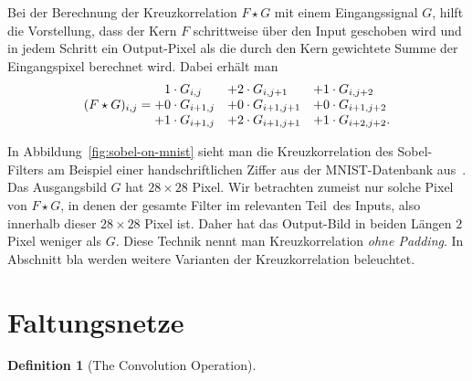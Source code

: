 \documentclass{article}
\theoremstyle{definition}
\newtheorem{definition}[theorem]{Definition}
\newcommand{\todo}[1]{{\color{red} #1}}
\begin{document}
Bei der Berechnung der Kreuzkorrelation $F\star G$ mit einem Eingangssignal $G$, hilft die Vorstellung, dass der Kern $F$ schrittweise über den Input geschoben wird und in jedem Schritt ein Output-Pixel als die durch den Kern gewichtete Summe der Eingangspixel berechnet wird.
Dabei erhält man
\[
(F\star G)_{i,j} = \begin{matrix*}[l]
    \hphantom{+}1\cdot G_{i,j}  & + 2\cdot G_{i, j+1} & + 1\cdot G_{i, j+2} \\
    + 0\cdot G_{i+1, j} &+ 0\cdot G_{i+1, j+1} &+ 0\cdot G_{i+1, j+2} \\
    +1\cdot G_{i+1, j} &+ 2\cdot G_{i+1, j+1} &+ 1\cdot G_{i+2, j+2}.
    \end{matrix*}
\]

In Abbildung~\ref{fig:sobel-on-mnist} sieht man die Kreuzkorrelation des Sobel-Filters am Beispiel einer handschriftlichen Ziffer aus der MNIST-Datenbank aus~\cite{lecun2010mnist}.
Das Ausgangsbild $G$ hat $28\times 28$ Pixel.
Wir betrachten zumeist nur solche Pixel von $F\star G$, in denen der gesamte Filter im \glqq relevanten Teil\grqq\ des Inputs, also innerhalb dieser $28\times 28$ Pixel ist.
Daher hat das Output-Bild in beiden Längen $2$ Pixel weniger als $G$.
Diese Technik nennt man Kreuzkorrelation \emph{ohne Padding}.
\todo{In Abschnitt bla werden weitere Varianten der Kreuzkorrelation beleuchtet.}

\section{Faltungsnetze}





\begin{definition}[The Convolution Operation]
    
\end{definition}

\clearpage          %
\thispagestyle{empty}

\end{document}
